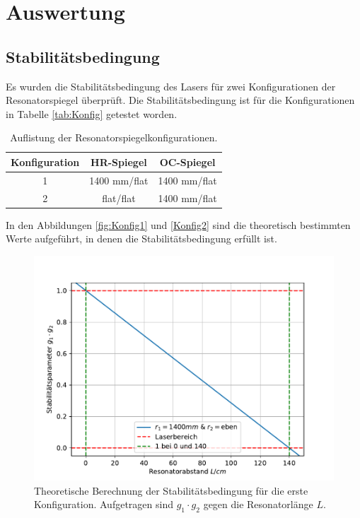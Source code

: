 \section{Auswertung}
\label{sec:Auswertung}
\subsection{Stabilitätsbedingung}
Es wurden die Stabilitätsbedingung des Lasers für zwei
Konfigurationen der Resonatorspiegel überprüft.
Die Stabilitätsbedingung \label{eq:osF} ist für die Konfigurationen in
Tabelle \ref{tab:Konfig} getestet worden.
\begin{table}[H]
    \centering
    \caption{Auflistung der Resonatorspiegelkonfigurationen.}
    \label{tab:Konfig1}
    \begin{tabular}{c|c|c|}
        \toprule
        Konfiguration & HR-Spiegel & OC-Spiegel \\
        \midrule
        1 & 1400 mm/flat &1400 mm/flat\\
        2&  flat/flat & 1400 mm/flat\\
        \bottomrule
    \end{tabular}
\end{table}
In den Abbildungen \ref{fig:Konfig1} und \ref{Konfig2} sind die theoretisch bestimmten
Werte aufgeführt, in denen die Stabilitätsbedingung erfüllt ist.
\begin{figure}[H]
  \centering
  \includegraphics{plots/Vorbereitungsplot2.pdf}
  \caption{Theoretische Berechnung der Stabilitätsbedingung für die erste
Konfiguration. Aufgetragen sind $g_1 \cdot g_2$ gegen die Resonatorlänge $L$.}
  \label{fig:Konfig2}
\end{figure}

